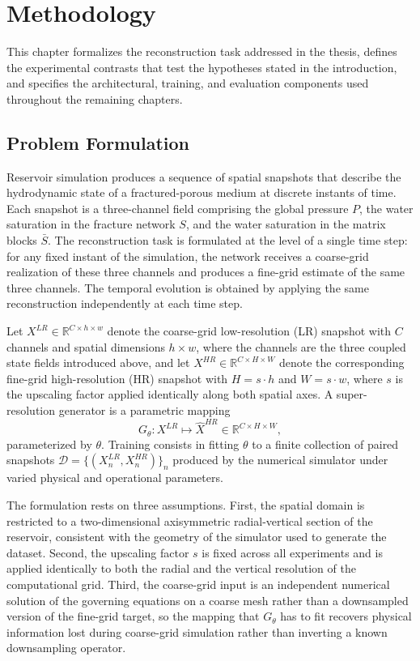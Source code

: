 \chapter{Methodology}
\label{chap:methodology}

This chapter formalizes the reconstruction task addressed in the thesis, defines the experimental contrasts that test the hypotheses stated in the introduction, and specifies the architectural, training, and evaluation components used throughout the remaining chapters.


\section{Problem Formulation}
\label{sec:method_problem}

Reservoir simulation produces a sequence of spatial snapshots that describe the hydrodynamic state of a fractured-porous medium at discrete instants of time. Each snapshot is a three-channel field comprising the global pressure $P$, the water saturation in the fracture network $S$, and the water saturation in the matrix blocks $\bar{S}$. The reconstruction task is formulated at the level of a single time step: for any fixed instant of the simulation, the network receives a coarse-grid realization of these three channels and produces a fine-grid estimate of the same three channels. The temporal evolution is obtained by applying the same reconstruction independently at each time step.

Let $X^{LR} \in \mathbb{R}^{C \times h \times w}$ denote the coarse-grid low-resolution (LR) snapshot with $C$ channels and spatial dimensions $h \times w$, where the channels are the three coupled state fields introduced above, and let $X^{HR} \in \mathbb{R}^{C \times H \times W}$ denote the corresponding fine-grid high-resolution (HR) snapshot with $H = s \cdot h$ and $W = s \cdot w$, where $s$ is the upscaling factor applied identically along both spatial axes. A super-resolution generator is a parametric mapping
\begin{equation}
    G_{\theta} : X^{LR} \mapsto \widehat{X}^{HR} \in \mathbb{R}^{C \times H \times W},
    \label{eq:sr_mapping}
\end{equation}
parameterized by $\theta$. Training consists in fitting $\theta$ to a finite collection of paired snapshots $\mathcal{D} = \{(X^{LR}_n, X^{HR}_n)\}_n$ produced by the numerical simulator under varied physical and operational parameters.

The formulation rests on three assumptions. First, the spatial domain is restricted to a two-dimensional axisymmetric radial-vertical section of the reservoir, consistent with the geometry of the simulator used to generate the dataset. Second, the upscaling factor $s$ is fixed across all experiments and is applied identically to both the radial and the vertical resolution of the computational grid. Third, the coarse-grid input is an independent numerical solution of the governing equations on a coarse mesh rather than a downsampled version of the fine-grid target, so the mapping that $G_{\theta}$ has to fit recovers physical information lost during coarse-grid simulation rather than inverting a known downsampling operator.

